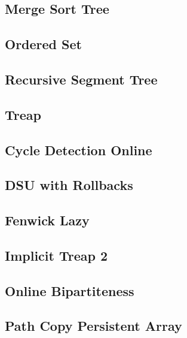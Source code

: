 \documentclass[10pt,letterpaper,landscape,twocolumn]{article}
\begin{document}
\subsection{Merge Sort Tree}

\subsection{Ordered Set}

\subsection{Recursive Segment Tree}

\subsection{Treap}

\subsection{Cycle Detection Online}

\subsection{DSU with Rollbacks}

\subsection{Fenwick Lazy}

\subsection{Implicit Treap 2}

\subsection{Online Bipartiteness}

\subsection{Path Copy Persistent Array}

\end{document}
